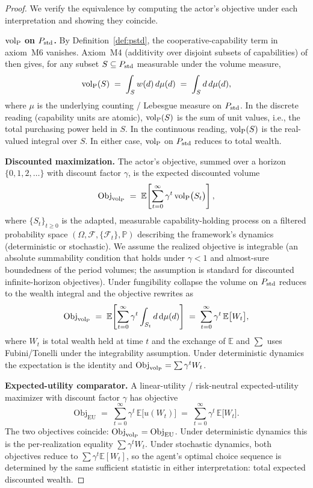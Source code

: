 \begin{proof}
We verify the equivalence by computing the actor's objective under
each interpretation and showing they coincide.

\medskip\noindent\textbf{${\operatorname{vol}_{\mathrm{P}}}$ on $P_{\mathrm{std}}$.}
By Definition~\ref{def:pstd}, the cooperative-capability term in
axiom~M6 vanishes.  Axiom~M4 (additivity over disjoint subsets of
capabilities) of \citep[Proposition~1]{lasser2026poset} then gives,
for any subset $S \subseteq P_{\mathrm{std}}$ measurable under the volume
measure,
\[
  {\operatorname{vol}_{\mathrm{P}}}(S) \;=\; \int_{S} w(d) \, d\mu(d) \;=\;
  \int_{S} d \, d\mu(d),
\]
where $\mu$ is the underlying counting / Lebesgue measure on
$P_{\mathrm{std}}$.  In the discrete reading (capability units are atomic),
${\operatorname{vol}_{\mathrm{P}}}(S)$ is the sum of unit values, i.e., the total purchasing power
held in $S$.  In the continuous reading, ${\operatorname{vol}_{\mathrm{P}}}(S)$ is the
real-valued integral over $S$.  In either case, ${\operatorname{vol}_{\mathrm{P}}}$ on $P_{\mathrm{std}}$
reduces to total wealth.

\medskip\noindent\textbf{Discounted maximization.}
The actor's objective, summed over a horizon $\{0, 1, 2, \dots\}$
with discount factor $\gamma$, is the expected discounted
volume
\[
  \mathrm{Obj}_{{\operatorname{vol}_{\mathrm{P}}}}
  \;=\; \mathbb{E}\!\left[
    \sum_{t=0}^{\infty} \gamma^{t} \,{\operatorname{vol}_{\mathrm{P}}}\bigl( S_t \bigr)
  \right],
\]
where $\{S_t\}_{t \geq 0}$ is the adapted, measurable
capability-holding process on a filtered probability space
$(\Omega, \mathcal{F}, \{\mathcal{F}_t\}, \mathbb{P})$ describing
the framework's dynamics (deterministic or stochastic).  We
assume the realized objective is integrable (an absolute
summability condition that holds under $\gamma < 1$ and
almost-sure boundedness of the period volumes; the assumption is
standard for discounted infinite-horizon objectives).  Under
fungibility collapse the
volume on $P_{\mathrm{std}}$ reduces to the wealth integral and the
objective rewrites as
\[
  \mathrm{Obj}_{{\operatorname{vol}_{\mathrm{P}}}}
  \;=\; \mathbb{E}\!\left[
    \sum_{t=0}^{\infty} \gamma^{t}
    \int_{S_t} d \,\mathrm{d}\mu(d)
  \right]
  \;=\; \sum_{t=0}^{\infty} \gamma^{t} \,\mathbb{E}\bigl[ W_t \bigr],
\]
where $W_t$ is total wealth held at time $t$ and the
exchange of $\mathbb{E}$ and $\sum$ uses Fubini/Tonelli under
the integrability assumption.  Under deterministic dynamics the
expectation is the identity and
$\mathrm{Obj}_{{\operatorname{vol}_{\mathrm{P}}}} = \sum \gamma^t W_t$.

\medskip\noindent\textbf{Expected-utility comparator.}
A linear-utility / risk-neutral expected-utility maximizer with
discount factor $\gamma$ has objective
\[
  \mathrm{Obj}_{\mathrm{EU}}
  \;=\; \sum_{t=0}^{\infty} \gamma^{t}
  \,\mathbb{E}\bigl[ u(W_t) \bigr]
  \;=\; \sum_{t=0}^{\infty} \gamma^{t}
  \,\mathbb{E}\bigl[ W_t \bigr].
\]
The two objectives coincide:
$\mathrm{Obj}_{{\operatorname{vol}_{\mathrm{P}}}} = \mathrm{Obj}_{\mathrm{EU}}$.  Under
deterministic dynamics this is the per-realization equality
$\sum \gamma^t W_t$.  Under stochastic dynamics, both
objectives reduce to $\sum \gamma^t \mathbb{E}[W_t]$, so the
agent's optimal choice sequence is determined by the same
sufficient statistic in either interpretation: total
expected discounted wealth.


\end{proof}
